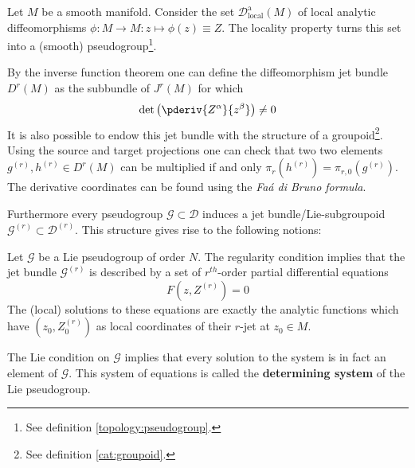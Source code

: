 	\begin{example}
		Let $M$ be a smooth manifold. Consider the set $\mathcal{D}^{\text{a}}_{\text{local}}(M)$ of local analytic diffeomorphisms $\phi:M\rightarrow M:z\mapsto\phi(z)\equiv Z$. The locality property turns this set into a (smooth) pseudogroup\footnote{See definition \ref{topology:pseudogroup}.}.
		
		By the inverse function theorem one can define the diffeomorphism jet bundle $D^r(M)$ as the subbundle of $J^r(M)$ for which \[\det\left(\pderiv{Z^\alpha}{z^\beta}\right)\neq0\] It is also possible to endow this jet bundle with the structure of a groupoid\footnote{See definition \ref{cat:groupoid}.}. Using the source and target projections one can check that two two elements $g^{(r)}, h^{(r)}\in D^r(M)$ can be multiplied if and only $\pi_r(h^{(r)}) = \pi_{r, 0}(g^{(r)})$. The derivative coordinates can be found using the \textit{Fa\'a di Bruno formula}.
		
		Furthermore every pseudogroup $\mathcal{G}\subset\mathcal{D}$ induces a jet bundle/Lie-subgroupoid $\mathcal{G}^{(r)}\subset\mathcal{D}^{(r)}$. This structure gives rise to the following notions:
	\end{example}
	\begin{property}
		Let $\mathcal{G}$ be a Lie pseudogroup of order $N$. The regularity condition implies that the jet bundle $\mathcal{G}^{(r)}$ is described by a set of $r^{th}$-order partial differential equations \[F\left(z, Z^{(r)}\right) = 0\] The (local) solutions to these equations are exactly the analytic functions which have $(z_0, Z^{(r)}_0)$ as local coordinates of their $r$-jet at $z_0\in M$.
		
		The Lie condition on $\mathcal{G}$ implies that every solution to the system is in fact an element of $\mathcal{G}$. This system of equations is called the \textbf{determining system} of the Lie pseudogroup.
	\end{property}
	
